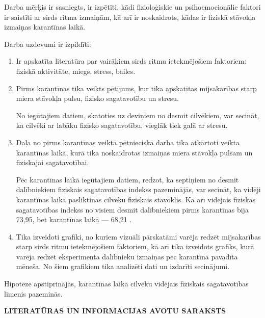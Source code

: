 \documentclass[12pt]{article}
\begin{document}
Darba mērķis ir sasniegts, ir izpētīti, kādi fizioloģiskie un psihoemocionālie faktori ir sais\-tīti ar sirds ritma izmaiņām, kā arī ir noskaidrots, kādas ir fiziskā stāvokļa izmaiņas karantīnas laikā. \par
Darba uzdevumi ir izpildīti:
\begin{enumerate}
  \item Ir apskatīta literatūra par vairākiem sirds ritmu ietekmējošiem faktoriem: fiziskā aktivitāte, miegs, stress, bailes.
  \item Pirms karantīnas tika veikts pētījums, kur tika apskatītas mijsakarības starp miera stāvokļa pulsu, fizisko sagatavotību un stresu.\par
  No iegūtajiem datiem, skatoties uz deviņiem no desmit cilvēkiem, var secināt, ka cilvēki ar labāku fizisko sagatavotību, vieglāk tiek galā ar stresu.
  \item Daļa no pirms karantīnas veiktā pētnieciskā darba tika atkārtoti veikta karantīnas laikā, kurā tika noskaidrotas izmaiņas miera stāvokļa pulsam un fiziskajai sagatavotībai. \par
Pēc karantīnas laikā iegūtajiem datiem, redzot, ka septiņiem no desmit dalībniekiem fiziskais sagatavotības indekss pazeminājās, var secināt, ka vidēji karantīnas laikā pasliktinās cilvēku fiziskais stāvoklis. Kā arī vidējais fiziskās sagatavotības indekss no visiem desmit dalībniekiem pirms karantīnas bija 73,95, bet karantīnas laikā — 68,21 .
\item Tika izveidoti grafiki, no kuriem vizuāli pārskatāmi varēja redzēt mijsakarības starp sirds ritmu ietekmējošiem faktoriem, kā arī tika izveidots grafiks, kurā varēja redzēt eksperimenta dalībnieku izmaiņas pēc karantīnā pavadīta mēneša. No šiem grafikiem tika analizēti dati un izdarīti secinājumi.
\end{enumerate}
Hipotēze apstiprinājās, karantīnas laikā cilvēku vidējais fiziskais sagatavotības līmenis pazeminās.

\newpage
\begin{center}
{\Large \bf LITERATŪRAS UN INFORMĀCIJAS AVOTU SARAKSTS}
\def\contname{\empty}
\end{center}
\end{document}
